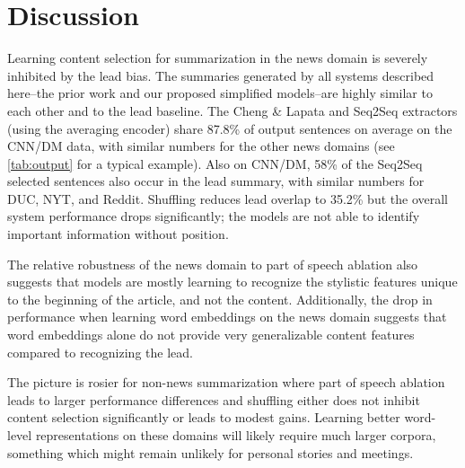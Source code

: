 


\section{Discussion}

Learning content selection for summarization in the news domain is severely inhibited by the lead bias. 
The summaries generated by all systems described here--the prior work and our proposed simplified models--are highly similar to each other and to the lead 
baseline. The Cheng \& Lapata and Seq2Seq 
extractors (using the averaging encoder) share 87.8\% of output sentences on average on the CNN/DM data,
with similar numbers for the other news domains (see \autoref{tab:output}
for a typical example).  
Also on CNN/DM, 58\% of the Seq2Seq %
selected sentences also occur
in the lead summary, with similar numbers for DUC, NYT, and Reddit. Shuffling
reduces lead overlap to 35.2\% but the overall system performance drops
    significantly; the models are not able to identify important information
    without position.
    
    The relative robustness of the news domain to part of speech ablation also 
    suggests that models are mostly learning to recognize the stylistic 
    features unique to the beginning of the article, and not the content.
    Additionally, the drop in performance when learning word embeddings on 
    the news domain suggests that word embeddings alone do not provide 
    very generalizable content features compared to recognizing the lead.

The picture is rosier for non-news summarization where part of speech ablation leads
to larger performance differences and shuffling either does not inhibit content
selection significantly or leads to modest gains. Learning better
word-level representations on these domains will likely require much
larger corpora, something which might remain unlikely for personal stories
and meetings.



